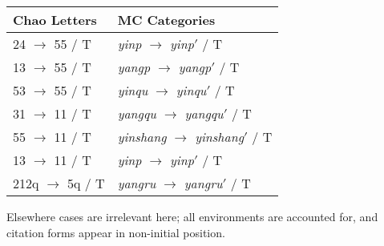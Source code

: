\documentclass{article}
\begin{document}
\begin{exe}
\ex
\begin{tabular}[t]{ll}
Chao Letters & MC Categories \\
\hline
24 $\rightarrow$ 55 / \underline{\hspace{1em}} T & \textit{yinp} $\rightarrow$ \textit{yinp}$'$ / \underline{\hspace{1em}} T \\ 
13 $\rightarrow$ 55 / \underline{\hspace{1em}} T & \textit{yangp} $\rightarrow$ \textit{yangp}$'$ / \underline{\hspace{1em}} T \\ 
53 $\rightarrow$ 55 / \underline{\hspace{1em}} T & \textit{yinqu} $\rightarrow$ \textit{yinqu}$'$ / \underline{\hspace{1em}} T \\ 
31 $\rightarrow$ 11 / \underline{\hspace{1em}} T & \textit{yangqu} $\rightarrow$ \textit{yangqu}$'$ / \underline{\hspace{1em}} T \\ 
55 $\rightarrow$ 11 / \underline{\hspace{1em}} T & \textit{yinshang} $\rightarrow$ \textit{yinshang}$'$ / \underline{\hspace{1em}} T \\ 
13 $\rightarrow$ 11 / \underline{\hspace{1em}} T & \textit{yinp} $\rightarrow$ \textit{yinp}$'$ / \underline{\hspace{1em}} T \\ 
212q $\rightarrow$ 5q / \underline{\hspace{1em}} T & \textit{yangru} $\rightarrow$ \textit{yangru}$'$ / \underline{\hspace{1em}} T \\ 
\end{tabular}
\end{exe}
 Elsewhere cases are irrelevant here; all environments are accounted for, and citation forms appear in non-initial position.
\end{document}
